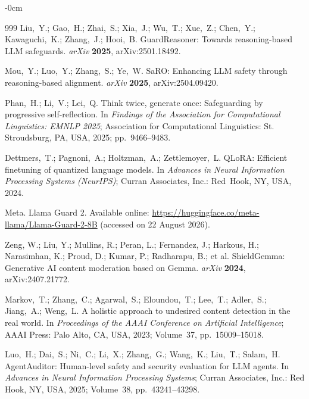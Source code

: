 \documentclass[superintelligence,article,accept,moreauthors]{Definitions/mdpi}
\renewcommand{\hl}[1]{#1}
\begin{document}
\begin{adjustwidth}{-\extralength}{0cm}
{\begin{thebibliography}{999}
Liu,~Y.; Gao,~H.; Zhai,~S.; Xia,~J.; Wu,~T.; Xue,~Z.; Chen,~Y.; Kawaguchi,~K.; Zhang,~J.; Hooi,~B.
{GuardReasoner}: Towards reasoning-based {LLM} safeguards.
{\em arXiv} {\bf 2025}, arXiv:2501.18492.

Mou,~Y.; Luo,~Y.; Zhang,~S.; Ye,~W.
{SaRO}: Enhancing {LLM} safety through reasoning-based alignment.
{\em arXiv} {\bf 2025}, arXiv:2504.09420.

Phan,~H.; Li,~V.; Lei,~Q.
Think twice, generate once: Safeguarding by progressive self-reflection.
In {\em Findings of the Association for Computational Linguistics: EMNLP 2025}; \hl{Association for Computational Linguistics: St. Stroudsburg, PA, USA,} 2025; pp.~9466--9483.

Dettmers,~T.; Pagnoni,~A.; Holtzman,~A.; Zettlemoyer,~L.
{QLoRA}: Efficient finetuning of quantized language models.
In {\em Advances in Neural Information Processing Systems (NeurIPS)}; \hl{Curran Associates, Inc.: Red~Hook, NY, USA,} 2024.

Meta. {Llama Guard 2}. Available online: \url{https://huggingface.co/meta-llama/Llama-Guard-2-8B} (accessed on 22 August 2026).



\hl{Zeng, W.; Liu, Y.; Mullins, R.; Peran, L.; Fernandez, J.; Harkous, H.; Narasimhan, K.; Proud, D.; Kumar, P.; Radharapu, B.; et al.} %
{ShieldGemma}: Generative {AI} content moderation based on {Gemma}.
{\em arXiv} {\bf 2024}, arXiv:2407.21772.

Markov,~T.; Zhang,~C.; Agarwal,~S.; Eloundou,~T.; Lee,~T.; Adler,~S.; Jiang,~A.; Weng,~L.
A holistic approach to undesired content detection in the real world.
In {\em Proceedings of the AAAI Conference on Artificial Intelligence}; \hl{AAAI Press: Palo Alto, CA, USA,} 2023; Volume~37, pp.~15009--15018.


Luo,~H.; Dai,~S.; Ni,~C.; Li,~X.; Zhang,~G.; Wang,~K.; Liu,~T.; Salam,~H.
{AgentAuditor}: Human-level safety and security evaluation for {LLM} agents.
In {\em Advances in Neural Information Processing Systems}; \hl{Curran Associates, Inc.: Red Hook, NY, USA,} {2025}; Volume~38, pp.~43241--43298.


\end{thebibliography}}
\end{adjustwidth}
\end{document}
